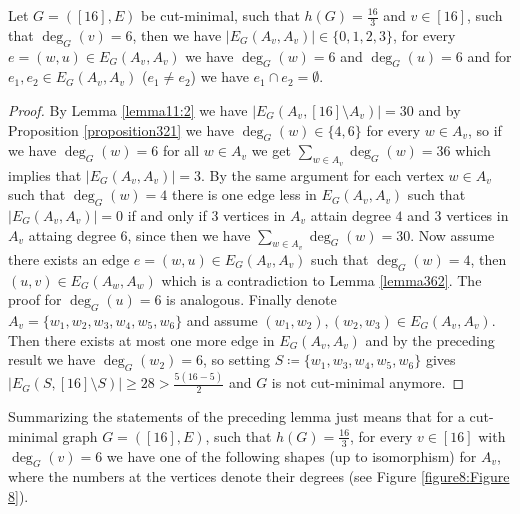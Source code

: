 \begin{lem}\label{lemma364}
Let \(G=([16],E)\) be cut-minimal, such that \(h(G)=\frac{16}{3}\) and \(v\in [16]\), such that \(\deg_G(v)=6\), then we have \(|E_G(A_v,A_v)|\in\{0,1,2,3\}\), for every \(e=(w,u)\in E_G(A_v,A_v)\) we have \(\deg_G(w)=6\) and \(\deg_G(u)=6\) and for \(e_1,e_2\in E_G(A_v,A_v)\) (\(e_1\neq e_2\)) we have \(e_1\cap e_2=\emptyset\).
\begin{proof}
By Lemma \ref{lemma11:2} we have \(|E_G(A_v,[16]\setminus A_v)|=30\) and by Proposition \ref{proposition321} we have \(\deg_G(w)\in\{4,6\}\) for every \(w\in A_v\), so if we have \(\deg_G(w)=6\) for all \(w\in A_v\) we get \(\sum\limits_{w\in A_v}\deg_G(w)=36\) which implies that \(|E_G(A_v,A_v)|=3\). By the same argument for each vertex \(w\in A_v\) such that \(\deg_G(w)=4\) there is one edge less in \(E_G(A_v,A_v)\) such that \(|E_G(A_v,A_v)|=0\) if and only if \(3\) vertices in \(A_v\) attain degree \(4\) and \(3\) vertices in \(A_v\) attaing degree \(6\), since then we have \(\sum\limits_{w\in A_v}\deg_G(w)=30\). Now assume there exists an edge \(e=(w,u)\in E_G(A_v,A_v)\) such that \(\deg_G(w)=4\), then \((u,v)\in E_G(A_w,A_w)\) which is a contradiction to Lemma \ref{lemma362}. The proof for \(\deg_G(u)=6\) is analogous. Finally denote \(A_v=\{w_1,w_2,w_3,w_4,w_5,w_6\}\) and assume \((w_1,w_2),(w_2,w_3)\in E_G(A_v,A_v)\). Then there exists at most one more edge in \(E_G(A_v,A_v)\) and by the preceding result we have \(\deg_G(w_2)=6\), so setting \(S\coloneqq\{w_1,w_3,w_4,w_5,w_6\}\) gives \(|E_G(S,[16]\setminus S)|\geq 28>\frac{5(16-5)}{2}\) and \(G\) is not cut-minimal anymore.
\end{proof}
\end{lem}

Summarizing the statements of the preceding lemma just means that for a cut-minimal graph \(G=([16],E)\), such that \(h(G)=\frac{16}{3}\), for every \(v\in [16]\) with \(\deg_G(v)=6\) we have one of the following shapes (up to isomorphism) for \(A_v\), where the numbers at the vertices denote their degrees (see Figure \ref{figure8:Figure 8}).

\newpage



